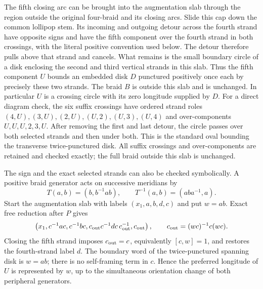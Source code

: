 \documentclass[11pt]{article}
\begin{document}
The fifth closing arc can be brought into the augmentation slab
through the region outside the original four-braid and its closing
arcs. Slide this cap down the common lollipop stem. Its incoming and
outgoing detour across the fourth strand have opposite signs and have
the fifth component over the fourth strand in both crossings, with
the literal positive convention used below. The detour therefore
pulls above that strand and cancels. What remains is the small
boundary circle of a disk enclosing the second and third vertical
strands in this slab. Thus the fifth component $U$ bounds an embedded
disk $D$ punctured positively once each by precisely these two strands.
The braid $B$ is outside this slab and is unchanged. In particular $U$
is a crossing circle with its zero longitude supplied by $D$.
For a direct diagram check, the six suffix crossings have ordered
strand roles
$(4,U),(3,U),(2,U),(U,2),(U,3),(U,4)$ and over-components
$U,U,U,2,3,U$. After removing the first and last detour, the circle
passes over both selected strands and then under both. This is the
standard oval bounding the transverse twice-punctured disk.
All suffix crossings and over-components are retained and checked
exactly; the full braid outside this slab is unchanged.

The sign and the exact selected strands can also be checked
symbolically. A positive braid generator acts on successive meridians
by
\[
 T(a,b)=(b,b^{-1}ab),\qquad
 T^{-1}(a,b)=(aba^{-1},a).
\]
Start the augmentation slab with labels $(x_1,a,b,d,c)$ and put $w=ab$.
Exact free reduction after $P$ gives
\[
 \left(x_1,c^{-1}ac,c^{-1}bc,
       c_{\rm out}c^{-1}dc\,c_{\rm out}^{-1},c_{\rm out}\right),
 \qquad c_{\rm out}=(wc)^{-1}c(wc).
\]
Closing the fifth strand imposes $c_{\rm out}=c$, equivalently
$[c,w]=1$, and restores the fourth-strand label $d$.
The boundary word of the twice-punctured spanning disk is $w=ab$;
there is no self-framing term in $c$. Hence the preferred longitude
of $U$ is represented by $w$, up to the simultaneous orientation
change of both peripheral generators.
\end{document}

